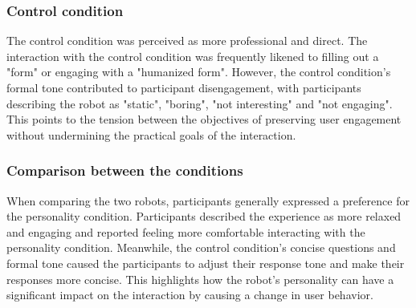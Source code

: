 \documentclass[runningheads]{llncs}
\begin{document}
\subsubsection*{Control condition}
The control condition was perceived as more professional and direct. The interaction with the control condition was frequently likened to filling out a "form" or engaging with a "humanized form". However, the control condition's formal tone contributed to participant disengagement, with participants describing the robot as "static", "boring", "not interesting" and "not engaging". This points to the tension between the objectives of preserving user engagement without undermining the practical goals of the interaction.

\subsubsection*{Comparison between the conditions}
When comparing the two robots, participants generally expressed a preference for the personality condition.
Participants described the experience as more relaxed and engaging and reported feeling more comfortable interacting with the personality condition. Meanwhile, the control condition's concise questions and formal tone caused the participants to adjust their response tone and make their responses more concise. This highlights how the robot's personality can have a significant impact on the interaction by causing a change in user behavior.
\end{document}
